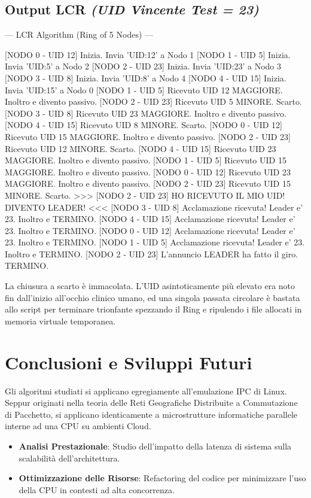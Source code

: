 \documentclass[a4paper,12pt]{article}
\begin{document}
\subsection{Output LCR \textit{(UID Vincente Test = 23)}}
\begin{terminal}
--- LCR Algorithm (Ring of 5 Nodes) ---

[NODO 0 - UID 12] Inizia. Invia 'UID:12' a Nodo 1
[NODO 1 - UID 5] Inizia. Invia 'UID:5' a Nodo 2
[NODO 2 - UID 23] Inizia. Invia 'UID:23' a Nodo 3
[NODO 3 - UID 8] Inizia. Invia 'UID:8' a Nodo 4
[NODO 4 - UID 15] Inizia. Invia 'UID:15' a Nodo 0
[NODO 1 - UID 5] Ricevuto UID 12 MAGGIORE. Inoltro e divento passivo.
[NODO 2 - UID 23] Ricevuto UID 5 MINORE. Scarto.
[NODO 3 - UID 8] Ricevuto UID 23 MAGGIORE. Inoltro e divento passivo.
[NODO 4 - UID 15] Ricevuto UID 8 MINORE. Scarto.
[NODO 0 - UID 12] Ricevuto UID 15 MAGGIORE. Inoltro e divento passivo.
[NODO 2 - UID 23] Ricevuto UID 12 MINORE. Scarto.
[NODO 4 - UID 15] Ricevuto UID 23 MAGGIORE. Inoltro e divento passivo.
[NODO 1 - UID 5] Ricevuto UID 15 MAGGIORE. Inoltro e divento passivo.
[NODO 0 - UID 12] Ricevuto UID 23 MAGGIORE. Inoltro e divento passivo.
[NODO 2 - UID 23] Ricevuto UID 15 MINORE. Scarto.
>>> [NODO 2 - UID 23] HO RICEVUTO IL MIO UID! DIVENTO LEADER! <<<
[NODO 3 - UID 8] Acclamazione ricevuta! Leader e' 23. Inoltro e TERMINO.
[NODO 4 - UID 15] Acclamazione ricevuta! Leader e' 23. Inoltro e TERMINO.
[NODO 0 - UID 12] Acclamazione ricevuta! Leader e' 23. Inoltro e TERMINO.
[NODO 1 - UID 5] Acclamazione ricevuta! Leader e' 23. Inoltro e TERMINO.
[NODO 2 - UID 23] L'annuncio LEADER ha fatto il giro. TERMINO.
\end{terminal}
La chiusura a scarto è immacolata. L'UID asintoticamente più elevato era noto fin dall'inizio all'occhio clinico umano, ed una singola passata circolare è bastata allo script per terminare trionfante spezzando il Ring e ripulendo i file allocati in memoria virtuale temporanea.

\section{Conclusioni e Sviluppi Futuri}
Gli algoritmi studiati si applicano egregiamente all'emulazione IPC di Linux. Seppur originati nella teoria delle Reti Geografiche Distribuite a Commutazione di Pacchetto, si applicano identicamente a microstrutture informatiche parallele interne ad una CPU su ambienti Cloud.


\begin{itemize}
    \item \textbf{Analisi Prestazionale}: Studio dell'impatto della latenza di sistema sulla scalabilità dell'architettura.
    \item \textbf{Ottimizzazione delle Risorse}: Refactoring del codice per minimizzare l'uso della CPU in contesti ad alta concorrenza.
\end{itemize}
\end{document}
